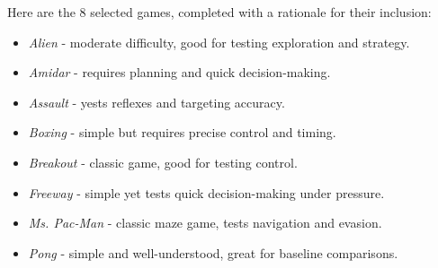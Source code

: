 Here are the 8 selected games, completed with a rationale for their inclusion:
\begin{itemize}
	\item \textit{Alien} - moderate difficulty, good for testing exploration and strategy.
	\item \textit{Amidar} - requires planning and quick decision-making.
	\item \textit{Assault} - yests reflexes and targeting accuracy.
	\item \textit{Boxing} - simple but requires precise control and timing.
	\item \textit{Breakout} - classic game, good for testing control.
	\item \textit{Freeway} - simple yet tests quick decision-making under pressure.
	\item \textit{Ms. Pac-Man} - classic maze game, tests navigation and evasion.
	\item \textit{Pong} - simple and well-understood, great for baseline comparisons.
\end{itemize}

